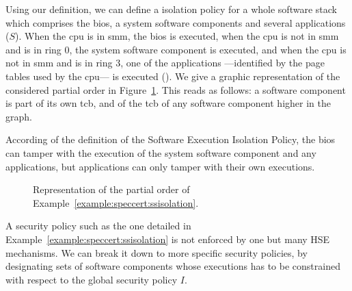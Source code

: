 \begin{example}
  \label{example:speccert:ssisolation}
  Using our definition, we can define a isolation policy for a whole software
  stack which comprises the \ac{bios}, a system software components and several
  applications ($S$).
  When the \ac{cpu} is in \ac{smm}, the \ac{bios} is executed, when the \ac{cpu}
  is not in \ac{smm} and is in ring 0, the system software component is
  executed, and when the \ac{cpu} is not in \ac{smm} and is in ring 3, one of
  the applications ---identified by the page tables used by the \ac{cpu}--- is
  executed ().
  We give a graphic representation of the considered partial order in
  Figure~\ref{fig:speccert:partialorder}.
  This reads as follows: a software component is part of its own \ac{tcb}, and
  of the \ac{tcb} of any software component higher in the graph.

  According of the definition of the Software Execution Isolation Policy, the
  \ac{bios} can tamper with the execution of the system software component and
  any applications, but applications can only tamper with their own executions.
\end{example}

\begin{figure}
  \begin{center}
  \end{center}
  \caption{Representation of the partial order of
    Example~\ref{example:speccert:ssisolation}.}
  \label{fig:speccert:partialorder}
\end{figure}

A security policy such as the one detailed in
Example~\ref{example:speccert:ssisolation} is not enforced by one but many HSE
mechanisms.
%
We can break it down to more specific security policies, by designating sets of
software components whose executions has to be constrained with respect to the
global security policy $I$.

